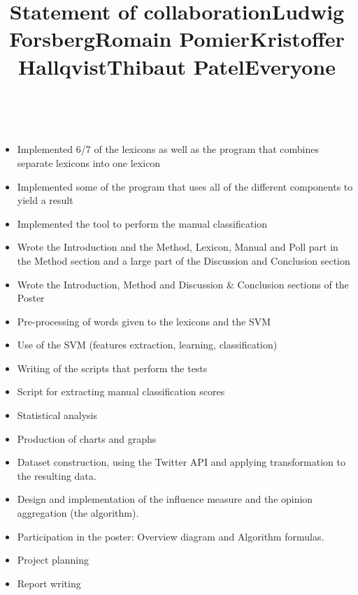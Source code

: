 \documentclass[a4paper,12pt]{report}
\begin{document}
\clearpage
\thispagestyle{empty}
\vspace*{2.15cm}
\title{\huge \textbf{Statement of collaboration}}
\vspace{1cm}\\
\title{\large \textbf{Ludwig Forsberg}}
\begin{itemize}
    \item Implemented 6/7 of the lexicons as well as the program that combines separate lexicons into one lexicon
    \item Implemented some of the program that uses all of the different components to yield a result
    \item Implemented the tool to perform the manual classification
    \item Wrote the Introduction and the Method, Lexicon, Manual and Poll part in the Method section and a large part of the Discussion and Conclusion section
    \item Wrote the Introduction, Method and Discussion \& Conclusion sections of the Poster
\end{itemize}
\title{\large \textbf{Romain Pomier}}
\begin{itemize}
  \item Pre-processing of words given to the lexicons and the SVM
  \item Use of the SVM (features extraction, learning, classification)
  \item Writing of the scripts that perform the tests
\end{itemize}
\title{\large \textbf{Kristoffer Hallqvist}}
\begin{itemize}
  \item Script for extracting manual classification scores
  \item Statistical analysis
  \item Production of charts and graphs
\end{itemize}
\title{\large \textbf{Thibaut Patel}}
\begin{itemize}
  \item Dataset construction, using the Twitter API and applying transformation to the resulting data.
  \item Design and implementation of the influence measure and the opinion aggregation (the algorithm).
  \item Participation in the poster: Overview diagram and Algorithm formulas.
\end{itemize}
\title{\large \textbf{Everyone}}
\begin{itemize}
  \item Project planning
  \item Report writing
\end{itemize}
\end{document}
